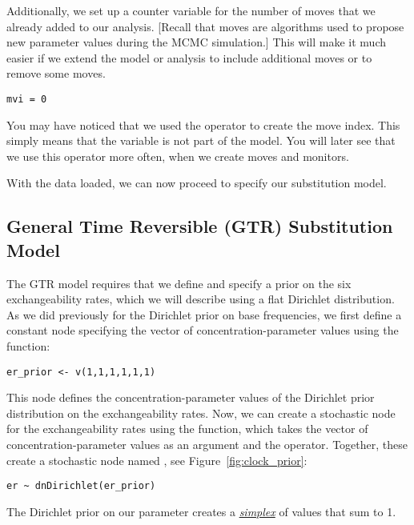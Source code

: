 Additionally, we set up a counter variable for the number of moves that we already added to our analysis.
[Recall that moves are algorithms used to propose new parameter values during the MCMC simulation.]
This will make it much easier if we extend the model or analysis to include additional moves or to remove some moves.
{\tt \begin{snugshade*}
\begin{lstlisting}
mvi = 0 
\end{lstlisting}
\end{snugshade*}}
You may have noticed that we used the \cl{=} operator to create the move index.
This simply means that the variable is not part of the model.
You will later see that we use this operator more often, \EG when we create moves and monitors.

With the data loaded, we can now proceed to specify our substitution model.



\subsection{General Time Reversible (GTR) Substitution Model}

The GTR model requires that we define and specify a prior on the six exchangeability rates, which we will describe using a flat Dirichlet distribution.
As we did previously for the Dirichlet prior on base frequencies, we first define a constant node specifying the vector of concentration-parameter values using the  function:
{\tt \begin{snugshade*}
\begin{lstlisting}
er_prior <- v(1,1,1,1,1,1) 
\end{lstlisting}
\end{snugshade*}}
This node defines the concentration-parameter values of the Dirichlet prior distribution on the exchangeability rates. 
Now, we can create a stochastic node for the exchangeability rates using the  function, which takes the vector of concentration-parameter values as an argument and the \cl{\rbdn} operator. 
Together, these create a stochastic node named , see Figure~\ref{fig:clock_prior}: 
{\tt \begin{snugshade*}
\begin{lstlisting}
er ~ dnDirichlet(er_prior)
\end{lstlisting}
\end{snugshade*}}
The Dirichlet prior on our parameter  creates a \href{http://en.wikipedia.org/wiki/Simplex}{\textit{simplex}} of values that sum to 1. 


